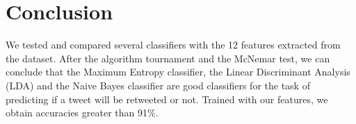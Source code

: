 \section{Conclusion}
\label{sec:conclusion}

We tested and compared several classifiers with the 12 features extracted from 
the dataset. After the algorithm tournament and the McNemar test, we can 
conclude that the Maximum Entropy classifier, the Linear Discriminant Analysis 
(LDA) and the Naive Bayes classifier are good classifiers for the task of 
predicting if a tweet will be retweeted or not. Trained with our features, we 
obtain accuracies greater than 91\%.